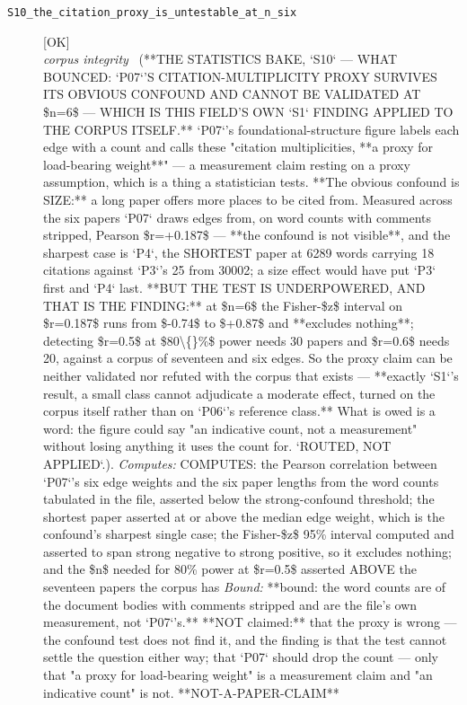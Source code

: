 \begin{description}
\item[\label{rcpt:S10_the_citation_proxy_is_untestable_at_n_six}\texttt{S10\_the\_citation\_proxy\_is\_untestable\_at\_n\_six}]\hfill\textsf{[OK]}\\
\textit{corpus integrity} \ (**THE STATISTICS BAKE, `S10` --- WHAT BOUNCED: `P07`'S CITATION-MULTIPLICITY PROXY SURVIVES ITS OBVIOUS CONFOUND AND CANNOT BE VALIDATED AT \$n=6\$ --- WHICH IS THIS FIELD'S OWN `S1` FINDING APPLIED TO THE CORPUS ITSELF.** `P07`'s foundational-structure figure labels each edge with a count and calls these "citation multiplicities, **a proxy for load-bearing weight**" --- a measurement claim resting on a proxy assumption, which is a thing a statistician tests. **The obvious confound is SIZE:** a long paper offers more places to be cited from. Measured across the six papers `P07` draws edges from, on word counts with comments stripped, Pearson \$r=+0.187\$ --- **the confound is not visible**, and the sharpest case is `P4`, the SHORTEST paper at 6289 words carrying 18 citations against `P3`'s 25 from 30002; a size effect would have put `P3` first and `P4` last. **BUT THE TEST IS UNDERPOWERED, AND THAT IS THE FINDING:** at \$n=6\$ the Fisher-\$z\$ interval on \$r=0.187\$ runs from \$-0.74\$ to \$+0.87\$ and **excludes nothing**; detecting \$r=0.5\$ at \$80\textbackslash\{\}\%\$ power needs 30 papers and \$r=0.6\$ needs 20, against a corpus of seventeen and six edges. So the proxy claim can be neither validated nor refuted with the corpus that exists --- **exactly `S1`'s result, a small class cannot adjudicate a moderate effect, turned on the corpus itself rather than on `P06`'s reference class.** What is owed is a word: the figure could say "an indicative count, not a measurement" without losing anything it uses the count for.  `ROUTED, NOT APPLIED`.). 
\emph{Computes:} COMPUTES: the Pearson correlation between `P07`'s six edge weights and the six paper lengths from the word counts tabulated in the file, asserted below the strong-confound threshold; the shortest paper asserted at or above the median edge weight, which is the confound's sharpest single case; the Fisher-\$z\$ 95\% interval computed and asserted to span strong negative to strong positive, so it excludes nothing; and the \$n\$ needed for 80\% power at \$r=0.5\$ asserted ABOVE the seventeen papers the corpus has
 \emph{Bound:} **bound: the word counts are of the document bodies with comments stripped and are the file's own measurement, not `P07`'s.** **NOT claimed:** that the proxy is wrong --- the confound test does not find it, and the finding is that the test cannot settle the question either way; that `P07` should drop the count --- only that "a proxy for load-bearing weight" is a measurement claim and "an indicative count" is not. **NOT-A-PAPER-CLAIM**

\end{description}

